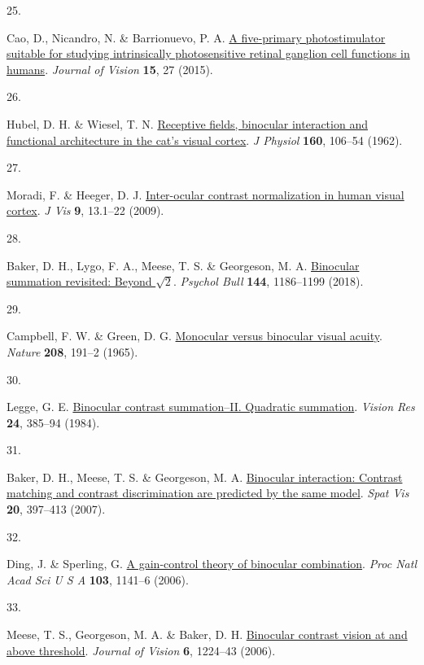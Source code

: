 \documentclass[
]{article}
\newlength{\cslhangindent}
\newlength{\csllabelwidth}
\newenvironment{CSLReferences}[2] %
 {\begin{list}{}{%
  \setlength{\itemindent}{0pt}
  \setlength{\leftmargin}{0pt}
  \setlength{\parsep}{0pt}
  \ifodd #1
   \setlength{\leftmargin}{\cslhangindent}
   \setlength{\itemindent}{-1\cslhangindent}
  \fi
  \setlength{\itemsep}{#2\baselineskip}}}
 {\end{list}}
\newcommand{\CSLLeftMargin}[1]{\parbox[t]{\csllabelwidth}{\strut#1\strut}}
\newcommand{\CSLRightInline}[1]{\parbox[t]{\linewidth - \csllabelwidth}{\strut#1\strut}}
\begin{document}
\begin{CSLReferences}{0}{0}
\CSLLeftMargin{25. }%
\CSLRightInline{Cao, D., Nicandro, N. \& Barrionuevo, P. A. \href{https://doi.org/10.1167/15.1.27}{A five-primary photostimulator suitable for studying intrinsically photosensitive retinal ganglion cell functions in humans}. \emph{Journal of Vision} \textbf{15}, 27 (2015).}

\CSLLeftMargin{26. }%
\CSLRightInline{Hubel, D. H. \& Wiesel, T. N. \href{https://doi.org/10.1113/jphysiol.1962.sp006837}{Receptive fields, binocular interaction and functional architecture in the cat's visual cortex}. \emph{J Physiol} \textbf{160}, 106--54 (1962).}

\CSLLeftMargin{27. }%
\CSLRightInline{Moradi, F. \& Heeger, D. J. \href{https://doi.org/10.1167/9.3.13}{Inter-ocular contrast normalization in human visual cortex}. \emph{J Vis} \textbf{9}, 13.1--22 (2009).}

\CSLLeftMargin{28. }%
\CSLRightInline{Baker, D. H., Lygo, F. A., Meese, T. S. \& Georgeson, M. A. \href{https://doi.org/10.1037/bul0000163}{Binocular summation revisited: Beyond \(\sqrt{2}\)}. \emph{Psychol Bull} \textbf{144}, 1186--1199 (2018).}

\CSLLeftMargin{29. }%
\CSLRightInline{Campbell, F. W. \& Green, D. G. \href{https://doi.org/10.1038/208191a0}{Monocular versus binocular visual acuity}. \emph{Nature} \textbf{208}, 191--2 (1965).}

\CSLLeftMargin{30. }%
\CSLRightInline{Legge, G. E. \href{https://doi.org/10.1016/0042-6989(84)90064-6}{Binocular contrast summation--II. Quadratic summation}. \emph{Vision Res} \textbf{24}, 385--94 (1984).}

\CSLLeftMargin{31. }%
\CSLRightInline{Baker, D. H., Meese, T. S. \& Georgeson, M. A. \href{https://doi.org/10.1163/156856807781503622}{Binocular interaction: Contrast matching and contrast discrimination are predicted by the same model}. \emph{Spat Vis} \textbf{20}, 397--413 (2007).}

\CSLLeftMargin{32. }%
\CSLRightInline{Ding, J. \& Sperling, G. \href{https://doi.org/10.1073/pnas.0509629103}{A gain-control theory of binocular combination}. \emph{Proc Natl Acad Sci U S A} \textbf{103}, 1141--6 (2006).}

\CSLLeftMargin{33. }%
\CSLRightInline{Meese, T. S., Georgeson, M. A. \& Baker, D. H. \href{https://doi.org/10.1167/6.11.7}{Binocular contrast vision at and above threshold}. \emph{Journal of Vision} \textbf{6}, 1224--43 (2006).}


\end{CSLReferences}
\end{document}
